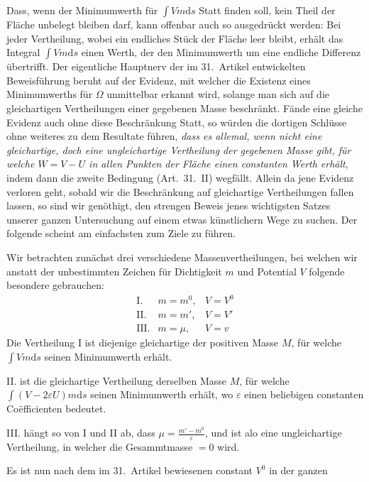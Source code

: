 Dass, wenn der Minimumwerth für $\int Vm\mathrm ds$ Statt finden soll, kein Theil der Fläche unbelegt bleiben darf, kann offenbar auch so ausgedrückt werden:
Bei jeder Vertheilung, wobei ein endliches Stück der Fläche leer bleibt, erhält das Integral $\int Vm\mathrm ds$ einen Werth, der den Minimumwerth um eine endliche Differenz übertrifft.
Der eigentliche Hauptnerv der im 31.\ Artikel entwickelten Beweisführung beruht auf der Evidenz, mit welcher die Existenz eines Minimumwerths für $\Omega$ unmittelbar erkannt wird, solange man sich auf die gleichartigen Vertheilungen einer gegebenen Masse beschränkt. Fände eine gleiche Evidenz auch ohne diese Beschränkung Statt, so würden die dortigen Schlüsse ohne weiteres zu dem Resultate führen, \textit{dass es allemal, wenn nicht eine gleichartige, doch eine ungleichartige Vertheilung der gegebenen Masse gibt, für welche $W=V-U$ in allen Punkten der Fläche einen constanten Werth erhält}, indem dann die zweite Bedingung (Art.\ 31.\ II) wegfällt. Allein da jene Evidenz verloren geht, sobald wir die Beschränkung auf gleichartige Vertheilungen fallen lassen, so sind wir genöthigt, den strengen Beweis jenes wichtigsten Satzes unserer ganzen Untersuchung auf einem etwas künstlichern Wege zu suchen. Der folgende scheint am einfachsten zum Ziele zu führen.

Wir betrachten zunächst drei verschiedene Massenvertheilungen, bei welchen wir anstatt der unbestimmten Zeichen für Dichtigkeit $m$ und Potential $V$ folgende besondere gebrauchen:
\[
\begin{array}{rll}
\mathrm{I.}&m=m^0,&V=V^0\\
\mathrm{II.}&m=m',&V=V'\\
\mathrm{III.}&m=\mu,&V=v
\end{array}
\]
Die Vertheilung I ist diejenige gleichartige der positiven Masse $M$, für welche $\int Vm\mathrm ds$ seinen Minimumwerth erhält.

II. ist die gleichartige Vertheilung derselben Masse $M$, für welche $\int(V-2\varepsilon U)m\mathrm ds$ seinen Minimumwerth erhält, wo $\varepsilon$ einen beliebigen constanten Coëfficienten bedeutet.

III. hängt so von I und II ab, dass $\mu=\frac{m'-m^0}{\varepsilon}$, und ist alo eine ungleichartige Vertheilung, in welcher die Gesammtmasse $=0$ wird.

Es ist nun nach dem im 31.\ Artikel bewiesenen constant $V^0$ in der ganzen
